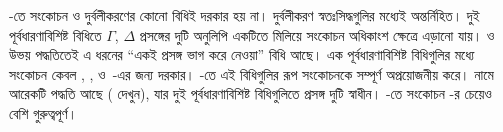 \documentclass[../../../include/open-logic-section]{subfiles}
\begin{document}
-তে সংকোচন ও দুর্বলীকরণের
কোনো বিধিই দরকার হয় না। দুর্বলীকরণ
স্বতঃসিদ্ধগুলির মধ্যেই অন্তর্নিহিত।
দুই পূর্বধারণাবিশিষ্ট বিধিতে
$\Gamma$, $\Delta$ প্রসঙ্গের
দুটি অনুলিপি একটিতে মিলিয়ে
সংকোচন অধিকাংশ ক্ষেত্রে এড়ানো যায়।
 ও  উভয়
পদ্ধতিতেই এ ধরনের ``একই প্রসঙ্গ
ভাগ করে নেওয়া'' বিধি আছে।
এক পূর্বধারণাবিশিষ্ট বিধিগুলির মধ্যে
সংকোচন কেবল \RightR{\lor},
\LeftR{\land}, \RightR{\lexists}
ও~\LeftR{\lforall}-এর জন্য দরকার।
-তে এই বিধিগুলির রূপ
সংকোচনকে সম্পূর্ণ অপ্রয়োজনীয় করে।
 নামে আরেকটি পদ্ধতি
আছে ( দেখুন),
যার দুই পূর্বধারণাবিশিষ্ট বিধিগুলিতে
প্রসঙ্গ দুটি স্বাধীন। -তে
সংকোচন -র চেয়েও বেশি
গুরুত্বপূর্ণ।


\end{document}

